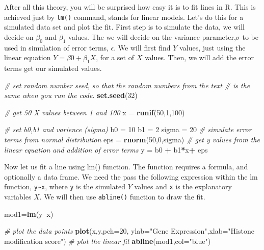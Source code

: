 \documentclass[12pt,]{krantz}
\newenvironment{Shaded}{\begin{snugshade}}{\end{snugshade}}
\newcommand{\CommentTok}[1]{\textcolor[rgb]{0.56,0.35,0.01}{\textit{#1}}}
\newcommand{\DataTypeTok}[1]{\textcolor[rgb]{0.13,0.29,0.53}{#1}}
\newcommand{\DecValTok}[1]{\textcolor[rgb]{0.00,0.00,0.81}{#1}}
\newcommand{\KeywordTok}[1]{\textcolor[rgb]{0.13,0.29,0.53}{\textbf{#1}}}
\newcommand{\NormalTok}[1]{#1}
\newcommand{\OperatorTok}[1]{\textcolor[rgb]{0.81,0.36,0.00}{\textbf{#1}}}
\newcommand{\StringTok}[1]{\textcolor[rgb]{0.31,0.60,0.02}{#1}}
\theoremstyle{definition}
\theoremstyle{definition}
\theoremstyle{definition}
\theoremstyle{remark}
\begin{document}
After all this theory, you will be surprised how easy it is to fit lines
in R. This is achieved just by \texttt{lm()} command, stands for linear
models. Let's do this for a simulated data set and plot the fit. First
step is to simulate the data, we will decide on \(\beta_0\) and
\(\beta_1\) values. The we will decide on the variance
parameter,\(\sigma\) to be used in simulation of error terms,
\(\epsilon\). We will first find \(Y\) values, just using the linear
equation \(Y=\beta0+\beta_1X\), for a set of \(X\) values. Then, we will
add the error terms get our simulated values.

\begin{Shaded}
\begin{Highlighting}[]
\CommentTok{# set random number seed, so that the random numbers from the text}
\CommentTok{# is the same when you run the code.}
\KeywordTok{set.seed}\NormalTok{(}\DecValTok{32}\NormalTok{)}

\CommentTok{# get 50 X values between 1 and 100}
\NormalTok{x =}\StringTok{ }\KeywordTok{runif}\NormalTok{(}\DecValTok{50}\NormalTok{,}\DecValTok{1}\NormalTok{,}\DecValTok{100}\NormalTok{)}

\CommentTok{# set b0,b1 and varience (sigma)}
\NormalTok{b0 =}\StringTok{ }\DecValTok{10}
\NormalTok{b1 =}\StringTok{ }\DecValTok{2}
\NormalTok{sigma =}\StringTok{ }\DecValTok{20}
\CommentTok{# simulate error terms from normal distribution}
\NormalTok{eps =}\StringTok{ }\KeywordTok{rnorm}\NormalTok{(}\DecValTok{50}\NormalTok{,}\DecValTok{0}\NormalTok{,sigma)}
\CommentTok{# get y values from the linear equation and addition of error terms}
\NormalTok{y =}\StringTok{ }\NormalTok{b0 }\OperatorTok{+}\StringTok{ }\NormalTok{b1}\OperatorTok{*}\NormalTok{x}\OperatorTok{+}\StringTok{ }\NormalTok{eps}
\end{Highlighting}
\end{Shaded}

Now let us fit a line using lm() function. The function requires a
formula, and optionally a data frame. We need the pass the following
expression within the lm function, \texttt{y\textasciitilde{}x}, where
\texttt{y} is the simulated \(Y\) values and \texttt{x} is the
explanatory variables \(X\). We will then use \texttt{abline()} function
to draw the fit.

\begin{Shaded}
\begin{Highlighting}[]
\NormalTok{mod1=}\KeywordTok{lm}\NormalTok{(y}\OperatorTok{~}\NormalTok{x)}

\CommentTok{# plot the data points}
\KeywordTok{plot}\NormalTok{(x,y,}\DataTypeTok{pch=}\DecValTok{20}\NormalTok{,}
     \DataTypeTok{ylab=}\StringTok{"Gene Expression"}\NormalTok{,}\DataTypeTok{xlab=}\StringTok{"Histone modification score"}\NormalTok{)}
\CommentTok{# plot the linear fit}
\KeywordTok{abline}\NormalTok{(mod1,}\DataTypeTok{col=}\StringTok{"blue"}\NormalTok{)}
\end{Highlighting}
\end{Shaded}
\end{document}
